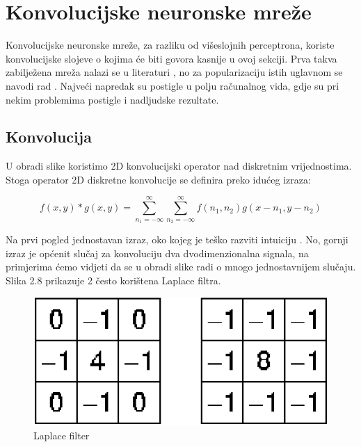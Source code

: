 \documentclass[times, utf8, diplomski]{fer}
\begin{document}
\pagebreak

\section{Konvolucijske neuronske mreže}
Konvolucijske neuronske mreže, za razliku od višeslojnih perceptrona, koriste konvolucijske slojeve o kojima će biti govora kasnije u ovoj sekciji. Prva takva zabilježena mreža nalazi se u literaturi \cite{neocognitron}, no za popularizaciju istih uglavnom se navodi rad \cite{convnet}. Najveći napredak su postigle u polju računalnog vida, gdje su pri nekim problemima postigle i nadljudske rezultate. 

\subsection{Konvolucija}
U obradi slike koristimo 2D konvolucijski operator nad diskretnim vrijednostima. Stoga operator 2D diskretne konvolucije se definira preko idućeg izraza:

\begin{equation}
f(x,y) * g(x,y) = \sum_{n_1 = -\infty}^\infty \sum_{n_2 = -\infty}^\infty f(n_1, n_2) g(x - n_1, y - n_2)
\end{equation}

Na prvi pogled jednostavan izraz, oko kojeg je teško razviti intuiciju \cite{convolution}. No, gornji izraz je općenit slučaj za konvoluciju dva dvodimenzionalna signala, na primjerima ćemo vidjeti da se u obradi slike radi o mnogo jednostavnijem slučaju. Slika 2.8 prikazuje 2 često korištena Laplace filtra.\par

\begin{figure}[htbp]
    \centering
    \includegraphics[scale=1]{Slike/laplace}
    \caption{Laplace filter \cite{laplace}}
\end{figure}
\end{document}
